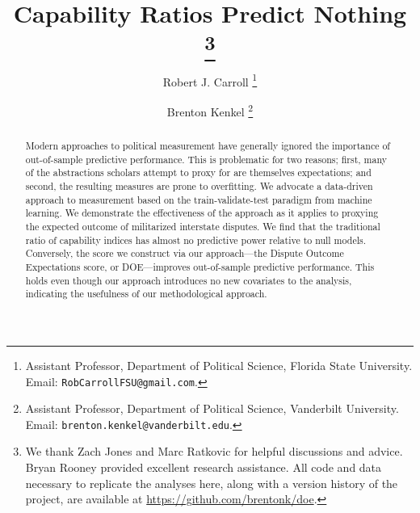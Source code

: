 \documentclass[11pt,oneside]{article}
\title{
  Capability Ratios Predict Nothing%
  \thanks{%
    We thank Zach Jones and Marc Ratkovic for helpful discussions and advice.
    Bryan Rooney provided excellent research assistance.
    All code and data necessary to replicate the analyses here, along with a version history of the project, are available at \url{https://github.com/brentonk/doe}.
  }%
}
\author{%
  Robert J. Carroll%
  \thanks{%
    Assistant Professor, Department of Political Science, Florida State University.  Email:  \nolinkurl{RobCarrollFSU@gmail.com}.
  }%
  \and%
  Brenton Kenkel%
  \thanks{
    Assistant Professor, Department of Political Science, Vanderbilt University.
    Email: \nolinkurl{brenton.kenkel@vanderbilt.edu}.
  }%
}
\begin{document}
\maketitle

\begin{abstract}
  Modern approaches to political measurement have generally ignored the importance of out-of-sample predictive performance. 
  This is problematic for two reasons; first, many of the abstractions scholars attempt to proxy for are themselves expectations; and second, the resulting measures are prone to overfitting. 
  We advocate a data-driven approach to measurement based on the train-validate-test paradigm from machine learning. 
  We demonstrate the effectiveness of the approach as it applies to proxying the expected outcome of militarized interstate disputes. 
  We find that the traditional ratio of capability indices has almost no predictive power relative to null models. 
  Conversely, the score we construct via our approach---the Dispute Outcome Expectations score, or DOE---improves out-of-sample predictive performance. 
  This holds even though our approach introduces no new covariates to the analysis, indicating the usefulness of our methodological approach.
\end{abstract}

\clearpage




















\clearpage
\appendix


\newpage


\end{document}
